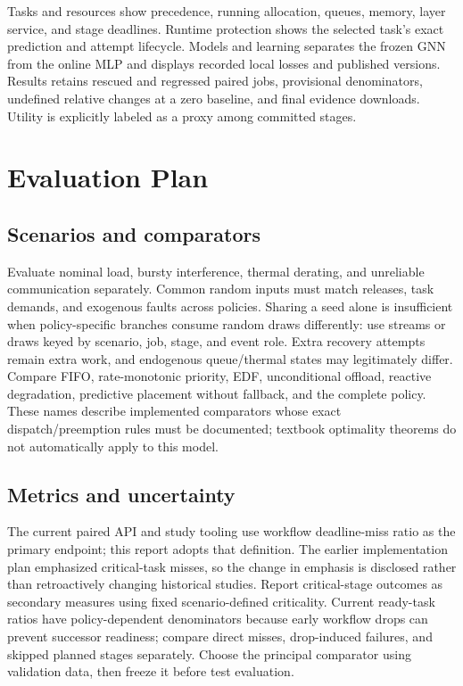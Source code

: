 \documentclass[11pt,a4paper]{article}
\begin{document}
Tasks and resources show precedence, running allocation, queues, memory, layer
service, and stage deadlines. Runtime protection shows the selected task's exact
prediction and attempt lifecycle. Models and learning separates the frozen GNN
from the online MLP and displays recorded local losses and published versions.
Results retains rescued and regressed paired jobs, provisional denominators,
undefined relative changes at a zero baseline, and final evidence downloads.
Utility is explicitly labeled as a proxy among committed stages.

\section{Evaluation Plan}
\subsection{Scenarios and comparators}
Evaluate nominal load, bursty interference, thermal derating, and unreliable
communication separately. Common random inputs must match releases, task demands, and exogenous faults
across policies. Sharing a seed alone is insufficient when policy-specific
branches consume random draws differently: use streams or draws keyed by
scenario, job, stage, and event role. Extra recovery attempts remain extra work,
and endogenous queue/thermal states may legitimately differ. Compare FIFO,
rate-monotonic priority, EDF, unconditional offload, reactive degradation,
predictive placement without fallback, and the complete policy. These names
describe implemented comparators whose exact dispatch/preemption rules must be
documented; textbook optimality theorems do not automatically apply to this model.

\subsection{Metrics and uncertainty}
The current paired API and study tooling use workflow deadline-miss ratio as
the primary endpoint; this report adopts that definition. The earlier implementation
plan emphasized critical-task misses, so the change in emphasis is disclosed
rather than retroactively changing historical studies. Report critical-stage
outcomes as secondary measures using fixed scenario-defined criticality. Current
ready-task ratios have policy-dependent denominators because early workflow drops
can prevent successor readiness; compare direct misses, drop-induced failures,
and skipped planned stages separately. Choose the principal comparator using
validation data, then freeze it before test evaluation.
\end{document}
